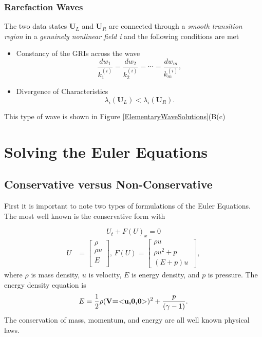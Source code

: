\documentclass[]{article}
\begin{document}
		\subsubsection{Rarefaction Waves}
			The two data states $ \textbf{U}_L $ and $ \textbf{U}_R $ are connected through a \textit{smooth transition region} in a \textit{genuinely nonlinear field i} and the following conditions are met
			\begin{itemize}
				\item Constancy of the GRIs across the wave
				\begin{equation}
					\frac{dw_1}{k_1^{(i)}} = \frac{dw_2}{k_2^{(i)}} = \cdots = \frac{dw_m}{k_m^{(i)}},
				\end{equation}
				\item Divergence of Characteristics
				\begin{equation}
					\lambda_i(\textbf{U}_L) <  \lambda_i(\textbf{U}_R).
				\end{equation}
			\end{itemize}
			This type of wave is shown in Figure \ref{ElementaryWaveSolutions}(B(c)
		
\section{Solving the Euler Equations}
	
	\subsection{Conservative versus Non-Conservative}
		First it is important to note two types of formulations of the Euler Equations. The most well known is the conservative form with
		
		\begin{equation}
			U_t + F(U)_x = 0
		\end{equation}
		\begin{align}
			U &= \begin{bmatrix}
			\rho \\
			\rho u \\
			E \\
			\end{bmatrix} \mbox{,  } 
			F(U) = \begin{bmatrix}
			\rho u \\
			\rho u^2 + p \\
			(E+p) u\
			\end{bmatrix},
			\label{EulerEquations}
		\end{align}
		where $ \rho $ is mass density, $ u $ is velocity, $ E $ is energy density, and $ p $ is pressure. The energy density equation is
		\begin{equation}
			E = \frac{1}{2}\rho(\textbf{V=$ < $u,0,0$ > $})^2 + \frac{p}{(\gamma -1)}.
		\end{equation}
		The conservation of mass, momentum, and energy are all well known physical laws. 
		
\end{document}
